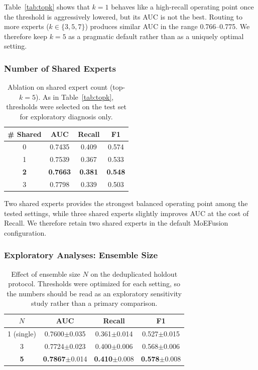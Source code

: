 ﻿\documentclass[sigconf,review,anonymous]{acmart}
\newcommand{\sys}{MoEFusion}
\begin{document}
Table~\ref{tab:topk} shows that $k{=}1$ behaves like a high-recall operating
point once the threshold is aggressively lowered, but its AUC is not the best.
Routing to more experts ($k \in \{3,5,7\}$) produces similar AUC in the range
0.766--0.775. We therefore keep $k{=}5$ as a pragmatic default rather than as
a uniquely optimal setting.

\subsubsection{Number of Shared Experts}

\begin{table}[t]
\centering
\caption{Ablation on shared expert count (top-$k{=}5$). As in
Table~\ref{tab:topk}, thresholds were selected on the test set for exploratory
diagnosis only.}
\label{tab:shared}
\small
\begin{tabular}{cccc}
\toprule
\# Shared & AUC & Recall & F1 \\
\midrule
0 & 0.7435 & 0.409 & 0.574 \\
1 & 0.7539 & 0.367 & 0.533 \\
\textbf{2} & \textbf{0.7663} & \textbf{0.381} & \textbf{0.548} \\
3 & 0.7798 & 0.339 & 0.503 \\
\bottomrule
\end{tabular}
\end{table}

Two shared experts provides the strongest balanced operating point among the
tested settings, while three shared experts slightly improves AUC at the cost of
Recall. We therefore retain two shared experts in the default \sys{}
configuration.

\subsubsection{Exploratory Analyses: Ensemble Size}

\begin{table}[t]
\centering
\caption{Effect of ensemble size $N$ on the deduplicated holdout protocol.
Thresholds were optimized for each setting, so the numbers should be read as an
exploratory sensitivity study rather than a primary comparison.}
\label{tab:ensemble}
\small
\begin{tabular}{cccc}
\toprule
$N$ & AUC & Recall & F1 \\
\midrule
1 (single) & 0.7600$\pm$0.035 & 0.361$\pm$0.014 & 0.527$\pm$0.015 \\
3 & 0.7724$\pm$0.023 & 0.400$\pm$0.006 & 0.568$\pm$0.006 \\
\textbf{5} & \textbf{0.7867}$\pm$0.014 & \textbf{0.410}$\pm$0.008 & \textbf{0.578}$\pm$0.008 \\
\bottomrule
\end{tabular}
\end{table}
\end{document}
